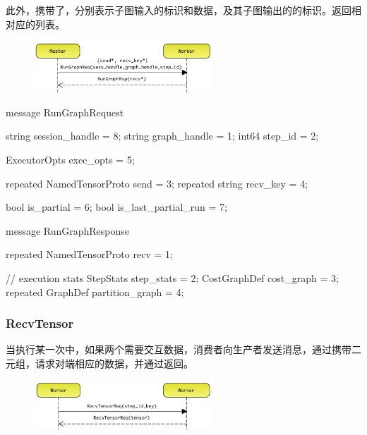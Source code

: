 \begin{content}
\begin{content}
\begin{content}
此外，携带了，分别表示子图输入的标识和数据，及其子图输出的的标识。返回相对应的列表。

\begin{figure}[H]
\centering
\includegraphics[width=0.6\textwidth]{figures/dist-worker-run-graph.png}
\caption{}
 \label{fig:dist-worker-run-graph}
\end{figure}

\begin{leftbar}
\begin{c++}
message RunGraphRequest {
  string session_handle = 8;
  string graph_handle = 1;
  int64 step_id = 2;

  ExecutorOpts exec_opts = 5;

  repeated NamedTensorProto send = 3;
  repeated string recv_key = 4;

  bool is_partial = 6;
  bool is_last_partial_run = 7;
}

message RunGraphResponse {
  repeated NamedTensorProto recv = 1;

  // execution stats
  StepStats step_stats = 2;
  CostGraphDef cost_graph = 3;
  repeated GraphDef partition_graph = 4;
}
\end{c++}
\end{leftbar}

\subsubsection{RecvTensor}

当执行某一次中，如果两个需要交互数据，消费者向生产者发送消息，通过携带二元组，请求对端相应的数据，并通过返回。

\begin{figure}[H]
\centering
\includegraphics[width=0.6\textwidth]{figures/dist-worker-recv-tensor.png}
\caption{}
 \label{fig:dist-worker-recv-tensor}
\end{figure}


\end{content}
\end{content}
\end{content}
